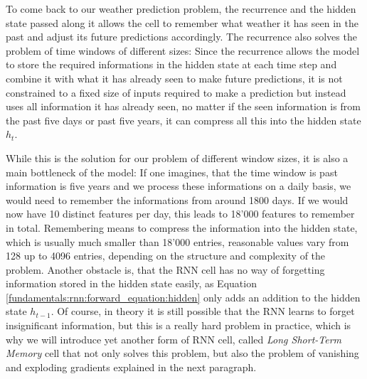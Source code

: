 To come back to our weather prediction problem, the recurrence and the hidden state passed along it allows the cell to remember what weather it has seen in the past and adjust its future predictions accordingly. The recurrence also solves the problem of time windows of different sizes: Since the recurrence allows the model to store the required informations in the hidden state at each time step and combine it with what it has already seen to make future predictions, it is not constrained to a fixed size of inputs required to make a prediction but instead uses all information it has already seen, no matter if the seen information is from the past five days or past five years, it can compress all this into the hidden state $h_t$.

While this is the solution for our problem of different window sizes, it is also a main bottleneck of the model: If one imagines, that the time window is past information is five years and we process these informations on a daily basis, we would need to remember the informations from around 1800 days. If we would now have 10 distinct features per day, this leads to 18'000 features to remember in total. Remembering means to compress the information into the hidden state, which is usually much smaller than 18'000 entries, reasonable values vary from 128 up to 4096 entries, depending on the structure and complexity of the problem. Another obstacle is, that the RNN cell has no way of forgetting information stored in the hidden state easily, as Equation \ref{fundamentals:rnn:forward_equation:hidden} only adds an addition to the hidden state $h_{t-1}$. Of course, in theory it is still possible that the RNN learns to forget insignificant information, but this is a really hard problem in practice, which is why we will introduce yet another form of RNN cell, called \emph{Long Short-Term Memory} cell that  not only solves this problem, but also the problem of vanishing and exploding gradients explained in the next paragraph.

